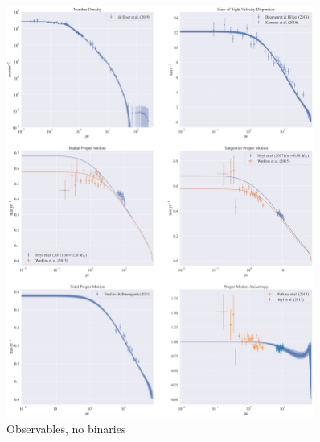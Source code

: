 \begin{figure}
	\begin{center}
		\includegraphics[width=0.9\textwidth]{figures/prev_nobin/obs_panel.png}
	\end{center}
	\caption{Observables, no binaries}
	\label{fig:nobin_obs_panel}
\end{figure}

